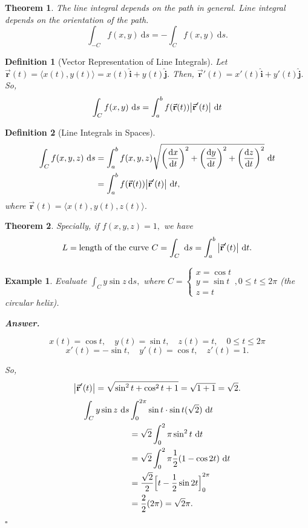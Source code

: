 \documentclass[12pt,a4paper]{article}
\newtheorem{thm}{Theorem}[subsection]
\newtheorem{df}{Definition}[subsection]
\newtheorem{eg}{Example}[subsection]
\newenvironment*{ans}{\par\indent\textbf{\textit{Answer. }}\par}{\par\hfill{$\square$}\par}
\def\dsst{\displaystyle}
\def\d{{\mathrm{d}}}
\def\ds{\d s}
\def\dt{\d t}
\def\intC{\dsst\int_C}
\def\vecr{\vec{\boldsymbol{\textbf{r}}}}
\def\veci{\hat{\boldsymbol{\textbf{i}}}}
\def\vecj{\hat{\boldsymbol{\textbf{j}}}}
\begin{document}
\begin{thm}
	The line integral depends on the path in general. Line integral depends on the orientation of the path.
	\[\int_{-C} f(x,y)\ \ds=-\intC f(x,y)\ \ds.\]	
\end{thm}
\begin{df}[Vector Representation of Line Integrals]
	Let $\vecr(t)=\langle x(t), y(t)\rangle=x(t)\veci+y(t)\vecj.$ Then, $\vecr'(t)=x'(t)\veci+y'(t)\vecj.$ So, \[\intC f(x,y)\ \ds=\int_a^b f(\vecr(t))\qty|\vecr'(t)|\ \dt\]	
\end{df}
\begin{df}[Line Integrals in Spaces]
	\[\begin{aligned}\intC f(x,y,z)\ \ds&=\int_a^b f(x,y,z)\sqrt{\qty(\dv{x}{t})^2+\qty(\dv{y}{t})^2+\qty(\dv{z}{t})^2}\ \dt\\&=\int_a^b f(\vecr(t))\qty|\vecr'(t)|\ \dt,\end{aligned}\] where $\vecr(t)=\langle x(t),y(t), z(t)\rangle.$
\end{df}
\begin{thm}
	Specially, if $f(x,y,z)=1,$ we have \[L=\text{length of the curve }C=\intC\ \ds=\int_a^b\qty|\vecr'(t)|\ \dt.\]	
\end{thm}
\begin{eg}
	Evaluate $\intC y\sin{z}\ \ds,$ where $C=\begin{cases}x=\cos{t}\\y=\sin{t}\\z=t\end{cases}, 0\leq t\leq2\pi$ (the circular helix).
	\begin{ans}
		\[x(t)=\cos{t},\quad y(t)=\sin{t},\quad z(t)=t,\quad 0\leq t\leq2\pi\] \[x'(t)=-\sin{t},\quad y'(t)=\cos{t},\quad z'(t)=1.\]\par So, \[\qty|\vecr'(t)|=\sqrt{\sin^2t+\cos^2t+1}=\sqrt{1+1}=\sqrt{2}.\]\[\begin{aligned}\intC y\sin{z}\ \ds&\int_0^{2\pi}\sin{t}\cdot\sin{t}(\sqrt{2})\ \dt\\&=\sqrt{2}\int_0^2\pi\sin^2t\ \dt\\&=\sqrt{2}\int_0^2\pi\dfrac{1}{2}(1-\cos{2t})\ \dt\\&=\dfrac{\sqrt{2}}{2}\qty\Big[t-\dfrac{1}{2}\sin{2t}]_0^{2\pi}\\&=\dfrac{2}{2}(2\pi)=\sqrt{2}\pi.\end{aligned}\]
	\end{ans}
\end{eg}
\end{document}
